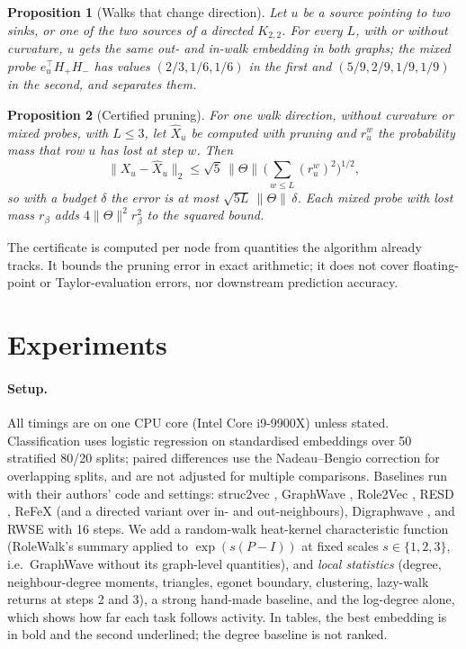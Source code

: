 \documentclass[10pt]{article}
\newtheorem{proposition}{Proposition}
\theoremstyle{definition}
\newcommand{\nTh}{\lVert\Theta\rVert}
\begin{document}
\begin{proposition}[Walks that change direction]\label{prop:mixed}
Let $u$ be a source pointing to two sinks, or one of the two sources of a directed $K_{2,2}$. For every $L$, with or without curvature, $u$ gets the same out- and in-walk embedding in both graphs; the mixed probe $e_u^\top H_+H_-$ has values $(2/3,1/6,1/6)$ in the first and $(5/9,2/9,1/9,1/9)$ in the second, and separates them.
\end{proposition}

\begin{proposition}[Certified pruning]\label{prop:prune}
For one walk direction, without curvature or mixed probes, with $L\le 3$, let $\hat X_u$ be computed with pruning and $r^w_u$ the probability mass that row $u$ has lost at step $w$. Then
\[
\lVert X_u - \hat X_u\rVert_2 \le \sqrt{5}\,\nTh\,\Big(\textstyle\sum_{w\le L}(r^w_u)^2\Big)^{1/2},
\]
so with a budget $\delta$ the error is at most $\sqrt{5L}\,\nTh\,\delta$. Each mixed probe with lost mass $r_\beta$ adds $4\nTh^2 r_\beta^2$ to the squared bound.
\end{proposition}

The certificate is computed per node from quantities the algorithm already tracks.
It bounds the pruning error in exact arithmetic; it does not cover floating-point or Taylor-evaluation errors, nor downstream prediction accuracy.

\section{Experiments}\label{sec:experiments}

\paragraph{Setup.}
All timings are on one CPU core (Intel Core i9-9900X) unless stated.
Classification uses logistic regression on standardised embeddings over 50 stratified 80/20 splits; paired differences use the Nadeau--Bengio correction for overlapping splits, and are not adjusted for multiple comparisons.
Baselines run with their authors' code and settings: struc2vec \citep{ribeiro2017}, GraphWave \citep{donnat2018}, Role2Vec \citep{ahmed2018}, RESD \citep{resd}, ReFeX \citep{henderson2011} (and a directed variant over in- and out-neighbours), Digraphwave \citep{ceylan2022}, and RWSE \citep{dwivedi2022} with 16 steps.
We add a random-walk heat-kernel characteristic function (RoleWalk's summary applied to $\exp(s(P-I))$ at fixed scales $s\in\{1,2,3\}$, i.e.\ GraphWave without its graph-level quantities), and \emph{local statistics} (degree, neighbour-degree moments, triangles, egonet boundary, clustering, lazy-walk returns at steps 2 and 3), a strong hand-made baseline, and the log-degree alone, which shows how far each task follows activity.
In tables, the best embedding is in bold and the second underlined; the degree baseline is not ranked.
\end{document}
